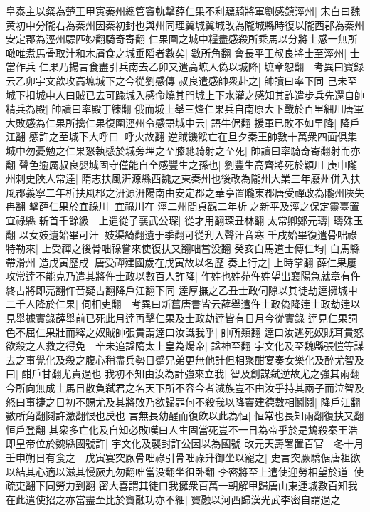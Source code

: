 皇泰主以粲為楚王甲寅秦州總管竇軌撃薛仁果不利驃騎將軍劉感鎮涇州|{
	宋白曰魏黄初中分隴右為秦州因秦初封也與州同理冀城冀城改為隴城縣時復以隴西郡為秦州安定郡為涇州驃匹妙翻騎奇寄翻}
仁果圍之城中糧盡感殺所乘馬以分將士感一無所噉唯煮馬骨取汁和木屑食之城垂䧟者數矣|{
	數所角翻}
會長平王叔良將士至涇州|{
	士當作兵}
仁果乃揚言食盡引兵南去乙卯又遣高墌人偽以城降|{
	墌章恕翻　考異曰寶録云乙卯宇文歆攻高墌城下之今從劉感傳}
叔良遣感帥衆赴之|{
	帥讀曰率下同}
己未至城下扣城中人曰賊已去可踰城入感命燒其門城上下水灌之感知其詐遣步兵先還自帥精兵為殿|{
	帥讀曰率殿丁練翻}
俄而城上舉三烽仁果兵自南原大下戰於百里細川唐軍大敗感為仁果所擒仁果復圍涇州令感語城中云|{
	語牛倨翻}
援軍已敗不如早降|{
	降戶江翻}
感許之至城下大呼曰|{
	呼火故翻}
逆賊饑餒亡在旦夕秦王帥數十萬衆四面俱集城中勿憂勉之仁果怒執感於城旁埋之至膝馳騎射之至死|{
	帥讀曰率騎奇寄翻射而亦翻}
聲色逾厲叔良嬰城固守僅能自全感豐生之孫也|{
	劉豐生高齊將死於穎川}
庚申隴州刺史陜人常逹|{
	隋志扶風汧源縣西魏之東秦州也後改為隴州大業三年廢州併入扶風郡義寧二年析扶風郡之汧源汧陽南由安定郡之華亭置隴東郡唐受禪改為隴州陜失冉翻}
擊薛仁果於宜祿川|{
	宜祿川在涇二州間貞觀二年析之新平及涇之保定靈臺置宜祿縣}
斬首千餘級　上遣從子襄武公琛|{
	從才用翻琛丑林翻}
太常卿鄭元璹|{
	璹殊玉翻}
以女妓遺始畢可汗|{
	妓渠綺翻遺于季翻可從刋入聲汗音寒}
壬戌始畢復遣骨咄祿特勒來|{
	上受禪之後骨咄祿嘗來使復扶又翻咄當没翻}
癸亥白馬道士傅仁均|{
	白馬縣帶滑州}
造戊寅歷成|{
	唐受禪建國歲在戊寅故以名歷}
奏上行之|{
	上時掌翻}
薛仁果屢攻常逹不能克乃遣其將仵士政以數百人詐降|{
	作姓也姓苑仵姓望出襄陽急就章有仵終古將即亮翻仵音疑古翻降戶江翻下同}
逹厚撫之乙丑士政伺隙以其徒劫逹擁城中二千人降於仁果|{
	伺相吏翻　考異曰新舊唐書皆云薛舉遣仵士政偽降逹士政劫逹以見舉據實錄薛舉前已死此月逹再擊仁果及士政劫逹皆有日月今從實錄}
逹見仁果詞色不屈仁果壯而釋之奴賊帥張貴謂逹曰汝識我乎|{
	帥所類翻}
逹曰汝逃死奴賊耳貴怒欲殺之人救之得免　辛未追諡隋太上皇為煬帝|{
	諡神至翻}
宇文化及至魏縣張愷等謀去之事覺化及殺之腹心稍盡兵勢日蹙兄弟更無他計但相聚酣宴奏女樂化及醉尤智及曰|{
	酣戶甘翻尤責過也}
我初不知由汝為計強來立我|{
	智及創謀弑逆故尤之強其兩翻}
今所向無成士馬日散負弑君之名天下所不容今者滅族豈不由汝乎持其兩子而泣智及怒曰事捷之日初不賜尤及其將敗乃欲歸罪何不殺我以降竇建德數相鬭鬩|{
	降戶江翻數所角翻鬩許激翻恨也戾也}
言無長幼醒而復飲以此為恒|{
	恒常也長知兩翻復扶又翻恒戶登翻}
其衆多亡化及自知必敗嘆曰人生固當死豈不一日為帝乎於是鴆殺秦王浩即皇帝位於魏縣國號許|{
	宇文化及襲封許公因以為國號}
改元天壽署置百官　冬十月壬申朔日有食之　戊寅宴突厥骨咄祿引骨咄祿升御坐以寵之|{
	史言突厥驕倨唐祖欲以結其心適以滋其慢厥九勿翻咄當没翻坐徂卧翻}
李密將至上遣使迎勞相望於道|{
	使疏吏翻下同勞力到翻}
密大喜謂其徒曰我擁衆百萬一朝解甲歸唐山東連城數百知我在此遣使招之亦當盡至比於竇融功亦不細|{
	竇融以河西歸漢光武李密自謂過之}
